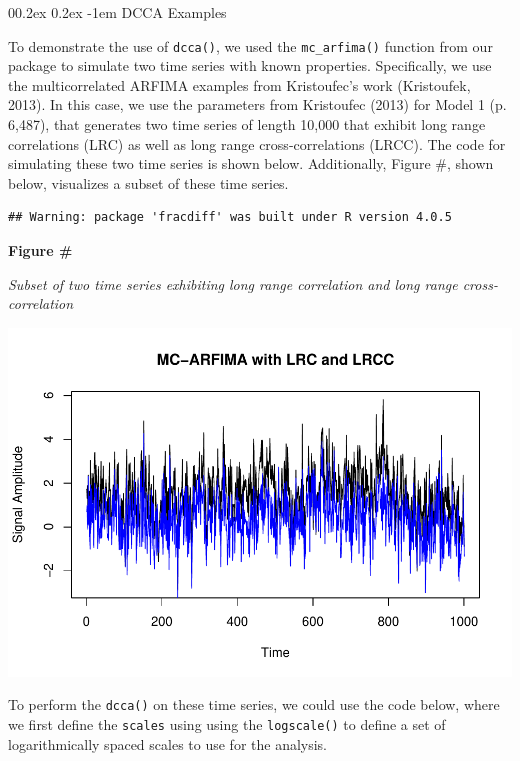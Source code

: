 \documentclass[
  man]{apa6}
\makeatletter
\let\oldparagraph\paragraph
\renewcommand{\paragraph}[1]{\oldparagraph{#1}\mbox{}}
\renewcommand{\paragraph}{\@startsection{paragraph}{4}{\parindent}%
  {0\baselineskip \@plus 0.2ex \@minus 0.2ex}%
  {-1em}%
  {\normalfont\normalsize\bfseries\itshape\typesectitle}}
\makeatother
\begin{document}
\hypertarget{dcca-examples}{%
\paragraph{DCCA Examples}\label{dcca-examples}}

To demonstrate the use of \texttt{dcca()}, we used the \texttt{mc\_arfima()} function
from our package to simulate two time series with known properties.
Specifically, we use the multicorrelated ARFIMA examples from
Kristoufec's work (Kristoufek, 2013). In
this case, we use the parameters from Kristoufec (2013) for Model 1 (p.
6,487), that generates two time series of length 10,000 that exhibit
long range correlations (LRC) as well as long range cross-correlations
(LRCC). The code for simulating these two time series is shown below.
Additionally, Figure \#, shown below, visualizes a subset of these time
series.

\begin{verbatim}
## Warning: package 'fracdiff' was built under R version 4.0.5
\end{verbatim}

\textbf{Figure \#}

\emph{Subset of two time series exhibiting long range correlation and long
range cross-correlation}

\includegraphics{fractal_regression_paper_brm_files/figure-latex/unnamed-chunk-13-1.pdf}

To perform the \texttt{dcca()} on these time series, we could use the code
below, where we first define the \texttt{scales} using using the \texttt{logscale()} to define a set
of logarithmically spaced scales to use for the analysis.
\end{document}

